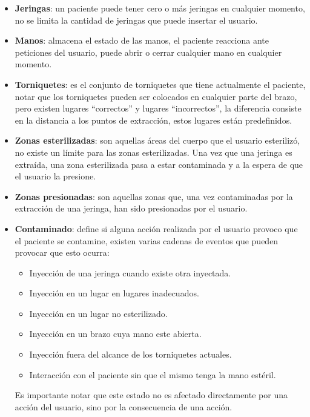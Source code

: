 \begin{itemize}
    \item \textbf{Jeringas}: un paciente puede tener cero o más jeringas en
        cualquier momento, no se limita la cantidad de jeringas que puede
        insertar el usuario.
    \item \textbf{Manos}: almacena el estado de las manos, el paciente reacciona
        ante peticiones del usuario, puede abrir o cerrar cualquier mano en
        cualquier momento.
    \item \textbf{Torniquetes}: es el conjunto de torniquetes que tiene
        actualmente el paciente, notar que los torniquetes pueden ser colocados
        en cualquier parte del brazo, pero existen lugares \enquote{correctos} y
        lugares \enquote{incorrectos}, la diferencia consiste en la distancia a
        los puntos de extracción, estos lugares están predefinidos.
    \item \textbf{Zonas esterilizadas}: son aquellas áreas del cuerpo que el
        usuario esterilizó, no existe un límite para las zonas esterilizadas.
        Una vez que una jeringa es extraída, una zona esterilizada pasa a estar
        contaminada y a la espera de que el usuario la presione.
    \item \textbf{Zonas presionadas}: son aquellas zonas que, una vez
        contaminadas por la extracción de una jeringa, han sido presionadas por
        el usuario.
    \item \textbf{Contaminado}: define si alguna acción realizada por el usuario
        provoco que el paciente se contamine, existen varias cadenas de eventos
        que pueden provocar que esto ocurra:
        \begin{itemize}
            \item Inyección de una jeringa cuando existe otra inyectada.
            \item Inyección en un lugar en lugares inadecuados.
            \item Inyección en un lugar no esterilizado.
            \item Inyección en un brazo cuya mano este abierta.
            \item Inyección fuera del alcance de los torniquetes actuales.
            \item Interacción con el paciente sin que el mismo tenga la mano
                estéril.
        \end{itemize}
        Es importante notar que este estado no es afectado directamente por una
        acción del usuario, sino por la consecuencia de una acción.
\end{itemize}

